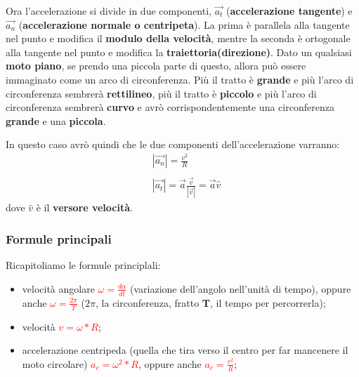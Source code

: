
				Ora l'accelerazione si divide in due componenti, $\vec{a_t}$ (\textbf{accelerazione tangente}) e $\vec{a_n}$ (\textbf{accelerazione normale o centripeta}). La prima è parallela alla tangente nel punto e modifica il \textbf{modulo della velocità}, mentre la seconda è ortogonale alla tangente nel punto e modifica la \textbf{traiettoria(direzione)}.
				Dato un qualsiasi \textbf{moto piano}, se prendo una piccola parte di questo, allora può essere immaginato come un arco di circonferenza. Più il tratto è \textbf{grande} e più l'arco di circonferenza sembrerà \textbf{rettilineo}, più il tratto è \textbf{piccolo} e più l'arco di circonferenza sembrerà \textbf{curvo} e avrò corrispondentemente una circonferenza \textbf{grande} e una \textbf{piccola}.


				In questo caso avrò quindi che le due componenti dell'accelerazione varranno:
				\begin{align*}
					&|\vec{a_n}|=\frac{v^2}{R}\\\\
					&|\vec{a_t}|=\vec{a}\frac{\vec{v}}{|\vec{v}|}=\vec{a}\hat{v}
				\end{align*}
				dove $\hat{v}$ è il \textbf{versore velocità}.

				\subsubsection{Formule principali}
					Ricapitoliamo le formule principlali:
					\begin{itemize}
						\item velocità angolare \textcolor{Red}{$\omega = \frac{d\alpha}{dt}$} (variazione dell'angolo nell'unità di tempo), oppure anche \textcolor{Red}{$\omega = \frac{2\pi}{T}$} ($2\pi$, la circonferenza, fratto \textbf{T}, il tempo per percorrerla);
						\item velocità \textcolor{Red}{$v = \omega * R$};
						\item accelerazione centripeda (quella che tira verso il centro per far mancenere il moto circolare) \textcolor{Red}{$a_c = \omega^2 * R$}, oppure anche \textcolor{Red}{$a_c = \frac{v^2}{R}$};
					\end{itemize}
